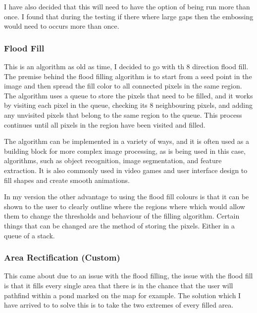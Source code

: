 \begin{FlushLeft}
    I have also decided that this will need to have the option of being run more than once. I found that during the testing if there where large gaps then the embossing would need to occurs more than once.\\
    \bk

    \subsubsection{Flood Fill}
    This is an algorithm as old as time, I decided to go with th 8 direction flood fill. The premise behind the flood filling algorithm is to start from a seed point in the image and then spread the fill color to all connected pixels in the same region. The algorithm uses a queue to store the pixels that need to be filled, and it works by visiting each pixel in the queue, checking its 8 neighbouring pixels, and adding any unvisited pixels that belong to the same region to the queue. This process continues until all pixels in the region have been visited and filled. \\ \bk

    The algorithm can be implemented in a variety of ways, and it is often used as a building block for more complex image processing, as is being used in this case, algorithms, such as object recognition, image segmentation, and feature extraction. It is also commonly used in video games and user interface design to fill shapes and create smooth animations. \\ \bk

    In my version the other advantage to using the flood fill colours is that it can be shown to the user to clearly outline where the regions where which would allow them to change the thresholds and behaviour of the filling algorithm. Certain things that can be changed are the method of storing the pixels. Either in a queue of a stack. \\ 
    \bk

    \subsubsection{Area Rectification (Custom)}
    This came about due to an issue with the flood filling, the issue with the flood fill is that it fills every single area that there is in the chance that the user will pathfind within a pond marked on the map for example. The solution which I have arrived to to solve this is to take the two extremes of every filled area. \\ \bk


\end{FlushLeft}
